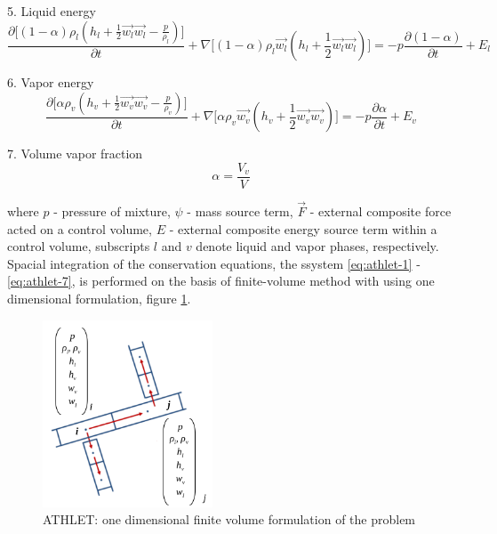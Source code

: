 5. Liquid energy
\begin{equation} \label{eq:athlet-5}
\frac{\partial \Big[ (1-\alpha)\rho_{l}(h_{l} + \frac{1}{2} \vec{w_{l}} \vec{w_{l}} - \frac{p}{\rho_{l}}) \Big]}{\partial t} + \nabla \Big[ (1-\alpha)\rho_{l}\vec{w_{l}}(h_{l} + \frac{1}{2} \vec{w_{l}} \vec{w_{l}}) \Big] = - p \frac{\partial (1 - \alpha)}{\partial t} + E_{l}
\end{equation}


6. Vapor energy
\begin{equation} \label{eq:athlet-6}
\frac{\partial \Big[ \alpha \rho_{v}(h_{v} + \frac{1}{2} \vec{w_{v}} \vec{w_{v}} - \frac{p}{\rho_{v}}) \Big]}{\partial t} + \nabla \Big[ \alpha\rho_{v}\vec{w_{v}}(h_{v} + \frac{1}{2} \vec{w_{v}} \vec{w_{v}}) \Big] = - p \frac{\partial \alpha}{\partial t} + E_{v}
\end{equation}

7. Volume vapor fraction
\begin{equation} \label{eq:athlet-7}
	\alpha = \frac{V_{v}}{V}
\end{equation}


where $p$ - pressure of mixture, $\psi$ - mass source term, $\vec{F}$ - external composite force acted on a control volume, $E$ - external composite energy source term within a control volume, subscripts $l$ and $v$ denote liquid and vapor phases, respectively. \\


Spacial integration of the conservation equations, the ssystem \ref{eq:athlet-1} - \ref{eq:athlet-7}, is performed on the basis of finite-volume method with using one dimensional formulation, figure \ref{fig:introduction-1d-fvm}.


\figpointer{\ref{fig:introduction-1d-fvm}}
\begin{figure}[htpb]
  \centering
  \includegraphics[width=0.45\textwidth]{figures/introduction-1d-fvm.png}
\caption{ATHLET: one dimensional finite volume formulation of the problem}
\label{fig:introduction-1d-fvm}
\end{figure}


